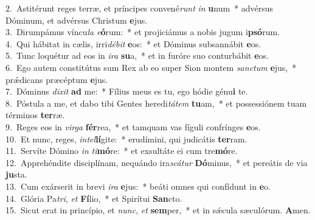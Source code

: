 {2.~}Astitérunt reges terræ, et príncipes convené\textit{runt} \textit{in} \textbf{u}num~* advérsus Dóminum, et advérsus Christum \textbf{e}jus.\\
{3.~}Dirumpámus víncu\textit{la} \textit{e}\textbf{ó}rum:~* et projiciámus a nobis jugum i\textbf{psó}rum.\\
{4.~}Qui hábitat in cælis, irri\textit{dé}\textit{bit} \textbf{e}os:~* et Dóminus subsannábit \textbf{e}os.\\
{5.~}Tunc loquétur ad eos in \textit{i}\textit{ra} \textbf{su}a,~* et in furóre suo conturbábit \textbf{e}os.\\
{6.~}Ego autem constitútus sum Rex ab eo super Sion montem \textit{san}\textit{ctum} \textbf{e}jus,~* prǽdicans præcéptum \textbf{e}jus.\\
{7.~}Dóminus \textit{di}\textit{xit} \textbf{ad} me:~* Fílius meus es tu, ego hódie génu\textbf{i} te.\\
{8.~}Póstula a me, et dabo tibi Gentes heredi\textit{tá}\textit{tem} \textbf{tu}am,~* et possessiónem tuam términos \textbf{ter}ræ.\\
{9.~}Reges eos in \textit{vir}\textit{ga} \textbf{fér}rea,~* et tamquam vas fíguli confrínges \textbf{e}os.\\
{10.~}Et nunc, reges, \textit{in}\textit{tel}\textbf{lí}gite:~* erudímini, qui judicátis \textbf{ter}ram.\\
{11.~}Servíte Dómino \textit{in} \textit{ti}\textbf{mó}re:~* et exsultáte ei cum tre\textbf{mó}re.\\
{12.~}Apprehéndite disciplínam, nequándo ira\textit{scá}\textit{tur} \textbf{Dó}minus,~* et pereátis de via \textbf{ju}sta.\\
{13.~}Cum exárserit in brevi \textit{i}\textit{ra} \textbf{e}jus:~* beáti omnes qui confídunt in \textbf{e}o.\\
{14.~}Glória Pa\textit{tri}, \textit{et} \textbf{Fí}lio,~* et Spirítui \textbf{San}cto.\\
{15.~}Sicut erat in princípio, et \textit{nunc}, \textit{et} \textbf{sem}per,~* et in sǽcula sæculórum. \textbf{A}men.\\
